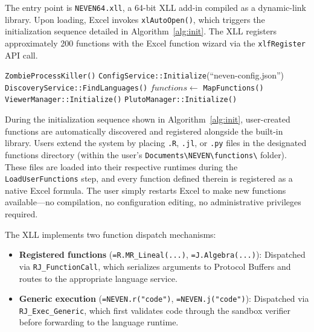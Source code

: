 The entry point is \texttt{NEVEN64.xll}, a 64-bit XLL add-in compiled as a dynamic-link library. Upon loading, Excel invokes \texttt{xlAutoOpen()}, which triggers the initialization sequence detailed in Algorithm~\ref{alg:init}. The XLL registers approximately 200 functions with the Excel function wizard via the \texttt{xlfRegister} API call.

\begin{algorithm}[htbp]
\SetAlgoLined
{}
\BlankLine
\texttt{ZombieProcessKiller()}
\texttt{ConfigService::Initialize}(``neven-config.json'')\;
\texttt{DiscoveryService::FindLanguages()}\;
\BlankLine
{}
\BlankLine
$functions \leftarrow$ \texttt{MapFunctions()}
\texttt{ViewerManager::Initialize()}
\texttt{PlutoManager::Initialize()}\;
\caption{System Initialization Sequence (\texttt{xlAutoOpen})}
\label{alg:init}
\end{algorithm}

During the initialization sequence shown in Algorithm~\ref{alg:init}, user-created functions are automatically discovered and registered alongside the built-in library. Users extend the system by placing \texttt{.R}, \texttt{.jl}, or \texttt{.py} files in the designated functions directory (within the user's \texttt{Documents\textbackslash NEVEN\textbackslash functions\textbackslash} folder). These files are loaded into their respective runtimes during the \texttt{LoadUserFunctions} step, and every function defined therein is registered as a native Excel formula. The user simply restarts Excel to make new functions available---no compilation, no configuration editing, no administrative privileges required.

The XLL implements two function dispatch mechanisms:
\begin{itemize}
    \item \textbf{Registered functions} (\texttt{=R.MR\_Lineal(...)}, \texttt{=J.Algebra(...)}): Dispatched via \texttt{RJ\_FunctionCall}, which serializes arguments to Protocol Buffers and routes to the appropriate language service.
    \item \textbf{Generic execution} (\texttt{=NEVEN.r("code")}, \texttt{=NEVEN.j("code")}): Dispatched via \texttt{RJ\_Exec\_Generic}, which first validates code through the sandbox verifier before forwarding to the language runtime.
\end{itemize}

